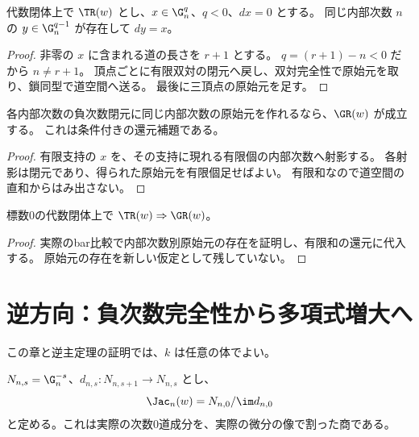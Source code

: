\begin{lemma}[同じ内部次数の原始元]\label{lem:internal-primitive}
\leanok
{}
代数閉体上で $\TR(w)$ とし、$x\in\G_n^q$、$q<0$、$dx=0$ とする。
同じ内部次数 $n$ の $y\in\G_n^{q-1}$ が存在して $dy=x$。
\end{lemma}
\begin{proof}\leanok
非零の $x$ に含まれる道の長さを $r+1$ とする。
$q=(r+1)-n<0$ だから $n\ne r+1$。
頂点ごとに有限双対の閉元へ戻し、双対完全性で原始元を取り、鎖同型で道空間へ送る。
最後に三頂点の原始元を足す。
\end{proof}

\begin{lemma}[有限和による原始元の組み立て]\label{lem:finite-primitives}
\leanok
{}
各内部次数の負次数閉元に同じ内部次数の原始元を作れるなら、$\GR(w)$ が成立する。
これは条件付きの還元補題である。
\end{lemma}
\begin{proof}\leanok
有限支持の $x$ を、その支持に現れる有限個の内部次数へ射影する。
各射影は閉元であり、得られた原始元を有限個足せばよい。
有限和なので道空間の直和からはみ出さない。
\end{proof}

\begin{theorem}[順主定理]\label{thm:forward}
\leanok
{}
標数0の代数閉体上で $\TR(w)\Rightarrow\GR(w)$。
\end{theorem}
\begin{proof}\leanok
実際のbar比較で内部次数別原始元の存在を証明し、有限和の還元に代入する。
原始元の存在を新しい仮定として残していない。
\end{proof}

\section{逆方向：負次数完全性から多項式増大へ}

この章と逆主定理の証明では、$k$ は任意の体でよい。

\begin{definition}[実際の内部Jacobi商]\label{def:jacobi}
\leanok
{}
$N_{n,s}=\G_n^{-s}$、$d_{n,s}:N_{n,s+1}\to N_{n,s}$ とし、
\[
 \Jac_n(w)=N_{n,0}/\im d_{n,0}
\]
と定める。これは実際の次数0道成分を、実際の微分の像で割った商である。
\end{definition}

